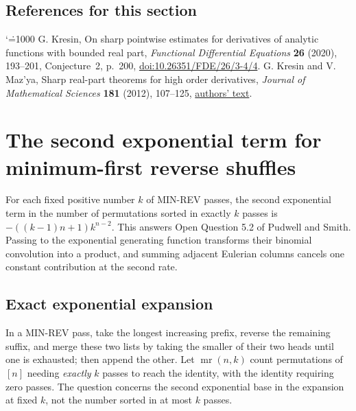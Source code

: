 \documentclass[11pt,a4paper]{article}
\makeatletter
\numberwithin{equation}{section}
\theoremstyle{definition}
\theoremstyle{remark}
\newenvironment{sectionabstract}{\par\smallskip\begingroup\small\noindent}{\par\endgroup\medskip}
\renewenvironment{thebibliography}[1]
 {\subsection*{References for this section}\small
  \list{\@biblabel{\@arabic\c@enumiv}}
       {\settowidth\labelwidth{\@biblabel{#1}}\leftmargin\labelwidth
        \advance\leftmargin\labelsep\@openbib@code
        \usecounter{enumiv}\let\p@enumiv\@empty
        \renewcommand\theenumiv{\@arabic\c@enumiv}}
  \sloppy\clubpenalty4000\widowpenalty4000\sfcode`\.=1000\relax}
 {\def\@noitemerr{\@latex@warning{Empty bibliography}}\endlist}
\makeatother
\begin{document}
\begin{thebibliography}{9}
 G. Kresin, On sharp pointwise estimates for derivatives of analytic functions with bounded real part, \emph{Functional Differential Equations} \textbf{26} (2020), 193--201, Conjecture~2, p.~200, \href{https://doi.org/10.26351/FDE/26/3-4/4}{doi:10.26351/FDE/26/3-4/4}.
 G. Kresin and V. Maz'ya, Sharp real-part theorems for high order derivatives, \emph{Journal of Mathematical Sciences} \textbf{181} (2012), 107--125, \href{https://users.mai.liu.se/vlama82/pdf/fulltext2.pdf}{authors' text}.
\end{thebibliography}

\par\endgroup

\begingroup
\newcommand{\mr}{\operatorname{mr}}
\section{\texorpdfstring{The second exponential term for minimum-first reverse shuffles}{The second exponential term for minimum-first reverse shuffles}}\label{section:r32reiwa}
\par\medskip


\begin{sectionabstract}
For each fixed positive number $k$ of MIN-REV passes, the second exponential
term in the number of permutations sorted in exactly $k$ passes is
$-((k-1)n+1)k^{n-2}$. This answers Open Question 5.2 of Pudwell and Smith.
Passing to the exponential generating function transforms their binomial
convolution into a product, and summing adjacent Eulerian columns cancels
one constant contribution at the second rate.
\end{sectionabstract}

\subsection*{Exact exponential expansion}
In a MIN-REV pass, take the longest increasing prefix, reverse the remaining
suffix, and merge these two lists by taking the smaller of their two heads
until one is exhausted; then append the other. Let $\mr(n,k)$ count permutations
of $[n]$ needing \emph{exactly} $k$ passes to reach the identity, with the identity
requiring zero passes. The question concerns the second exponential base in
the expansion at fixed $k$, not the number sorted in at most $k$ passes.
\end{document}
